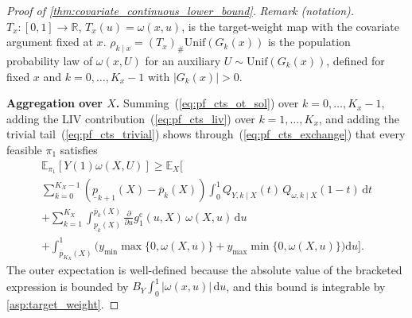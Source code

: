 \begin{proof}[Proof of \cref{thm:covariate_continuous_lower_bound}]
\noindent\textit{Remark (notation).} $T_x:[0,1]\to\mathbb R$, $T_x(u)=\omega(x,u)$, is the target-weight map with the covariate argument fixed at $x$. $\rho_{k\mid x}=(T_x)_{\#}\mathrm{Unif}(G_k(x))$ is the population probability law of $\omega(x,U)$ for an auxiliary $U\sim\mathrm{Unif}(G_k(x))$, defined for fixed $x$ and $k=0,\ldots,K_x-1$ with $|G_k(x)|>0$.


\medskip
\noindent\textbf{Aggregation over $X$.}
Summing~(\ref{eq:pf_cts_ot_sol}) over $k = 0,\dots,K_x-1$, adding the LIV contribution~(\ref{eq:pf_cts_liv}) over $k = 1,\dots,K_x$, and adding the trivial tail~(\ref{eq:pf_cts_trivial}) shows through~(\ref{eq:pf_cts_exchange}) that every feasible $\pi_1$ satisfies
\begin{multline*}
    \mathbb E_{\pi_1}[Y(1)\omega(X,U)] \geqslant \mathbb{E}_{X}\Bigg[ \\
    \sum_{k=0}^{K_X-1}(\underline{p}_{k+1}(X)-\overline{p}_k(X))\int_0^1 Q_{Y,k\mid X}(t)\,Q_{\omega,k\mid X}(1-t)\,\mathrm{d}t \\
    + \sum_{k=1}^{K_X}\int_{\underline{p}_k(X)}^{\overline{p}_k(X)} \frac{\partial}{\partial u}g_1^{\mathrm c}(u,X)\,\omega(X, u)\,\mathrm{d}u \\
    + \int_{\overline{p}_{K_X}(X)}^{1}\Big(y_{\min}\max\{0,\omega(X,u)\} + y_{\max}\min\{0,\omega(X,u)\}\Big)\mathrm{d}u\Bigg].
\end{multline*}
The outer expectation is well-defined because the absolute value of the bracketed expression is bounded by $B_Y\int_0^1|\omega(x,u)|\,\mathrm du$, and this bound is integrable by \cref{asp:target_weight}.


\end{proof}
